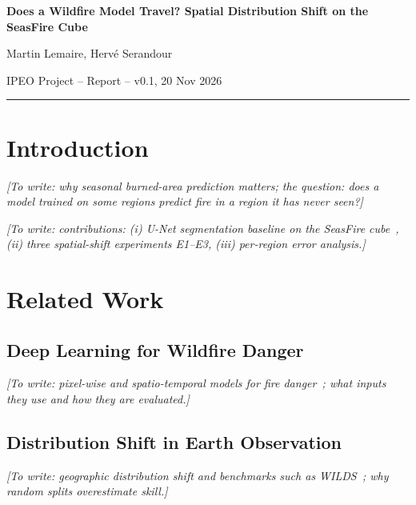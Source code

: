 \documentclass[10pt,a4paper]{article}
\newcommand\guide[1]{\textit{[To write: #1]}\par}                       %
\newcommand\dummy[1]{\lipsum[#1]\par}                                   %
\begin{document}
\begin{center}
  {\LARGE\bfseries Does a Wildfire Model Travel? Spatial Distribution Shift on the SeasFire Cube\par}
  \vspace{0.4em}
  {\small Martin Lemaire, Herv\'e Serandour\par}
  {\small IPEO Project -- Report -- v0.1, 20 Nov 2026\par}
\end{center}

\begin{abstract}
\guide{the result first: how much F1 drops when a region is left out of training, and whether balanced training closes the gap. 150 words max.}
\dummy{1}
\end{abstract}

{\small\setlength{\parskip}{0pt}\setcounter{tocdepth}{2}\renewcommand{\contentsname}{\normalsize Contents}\tableofcontents}
\vspace{0.5em}\hrule\vspace{0.5em}

\section{Introduction}
\guide{why seasonal burned-area prediction matters; the question: does a model trained on some regions predict fire in a region it has never seen?}
\dummy{2-3}
\dummy{30-31}
\guide{contributions: (i) U-Net segmentation baseline on the SeasFire cube~\cite{seasfire}, (ii) three spatial-shift experiments E1--E3, (iii) per-region error analysis.}
\dummy{4}

\section{Related Work}
\subsection{Deep Learning for Wildfire Danger}
\guide{pixel-wise and spatio-temporal models for fire danger~\cite{kondylatos,prapas}; what inputs they use and how they are evaluated.}
\dummy{5-6}
\dummy{32-33}
\subsection{Distribution Shift in Earth Observation}
\guide{geographic distribution shift and benchmarks such as WILDS~\cite{wilds}; why random splits overestimate skill.}
\dummy{7-8}
\dummy{34-35}
\end{document}
